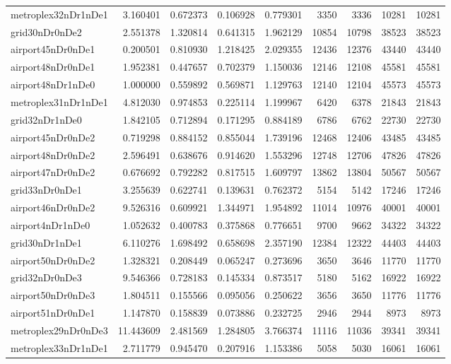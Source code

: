\begin{longtable}{|l|r|r|r|r|r|r|r|r|}
metroplex32nDr1nDe1 & 3.160401 & 0.672373 & 0.106928 & 0.779301 & 3350 & 3336 & 10281 & 10281 \\
grid30nDr0nDe2 & 2.551378 & 1.320814 & 0.641315 & 1.962129 & 10854 & 10798 & 38523 & 38523 \\
airport45nDr0nDe1 & 0.200501 & 0.810930 & 1.218425 & 2.029355 & 12436 & 12376 & 43440 & 43440 \\
airport48nDr0nDe1 & 1.952381 & 0.447657 & 0.702379 & 1.150036 & 12146 & 12108 & 45581 & 45581 \\
airport48nDr1nDe0 & 1.000000 & 0.559892 & 0.569871 & 1.129763 & 12140 & 12104 & 45573 & 45573 \\
metroplex31nDr1nDe1 & 4.812030 & 0.974853 & 0.225114 & 1.199967 & 6420 & 6378 & 21843 & 21843 \\
grid32nDr1nDe0 & 1.842105 & 0.712894 & 0.171295 & 0.884189 & 6786 & 6762 & 22730 & 22730 \\
airport45nDr0nDe2 & 0.719298 & 0.884152 & 0.855044 & 1.739196 & 12468 & 12406 & 43485 & 43485 \\
airport48nDr0nDe2 & 2.596491 & 0.638676 & 0.914620 & 1.553296 & 12748 & 12706 & 47826 & 47826 \\
airport47nDr0nDe2 & 0.676692 & 0.792282 & 0.817515 & 1.609797 & 13862 & 13804 & 50567 & 50567 \\
grid33nDr0nDe1 & 3.255639 & 0.622741 & 0.139631 & 0.762372 & 5154 & 5142 & 17246 & 17246 \\
airport46nDr0nDe2 & 9.526316 & 0.609921 & 1.344971 & 1.954892 & 11014 & 10976 & 40001 & 40001 \\
airport4nDr1nDe0 & 1.052632 & 0.400783 & 0.375868 & 0.776651 & 9700 & 9662 & 34322 & 34322 \\
grid30nDr1nDe1 & 6.110276 & 1.698492 & 0.658698 & 2.357190 & 12384 & 12322 & 44403 & 44403 \\
airport50nDr0nDe2 & 1.328321 & 0.208449 & 0.065247 & 0.273696 & 3650 & 3646 & 11770 & 11770 \\
grid32nDr0nDe3 & 9.546366 & 0.728183 & 0.145334 & 0.873517 & 5180 & 5162 & 16922 & 16922 \\
airport50nDr0nDe3 & 1.804511 & 0.155566 & 0.095056 & 0.250622 & 3656 & 3650 & 11776 & 11776 \\
airport51nDr0nDe1 & 1.147870 & 0.158839 & 0.073886 & 0.232725 & 2946 & 2944 & 8973 & 8973 \\
metroplex29nDr0nDe3 & 11.443609 & 2.481569 & 1.284805 & 3.766374 & 11116 & 11036 & 39341 & 39341 \\
metroplex33nDr1nDe1 & 2.711779 & 0.945470 & 0.207916 & 1.153386 & 5058 & 5030 & 16061 & 16061 \\

\end{longtable}
